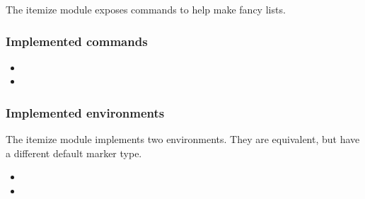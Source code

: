 \begin{paragraph}
    The itemize module exposes commands to help make fancy lists.
\end{paragraph}

\subsubsection{Implemented commands}
\begin{itemize}
    \item{}
    \item{}
\end{itemize}

\subsubsection{Implemented environments}
\begin{paragraph}
The itemize module implements two environments. They are equivalent, but have a different default marker type.
\end{paragraph}
\begin{itemize}
    \item{}
    \item{}
\end{itemize}


